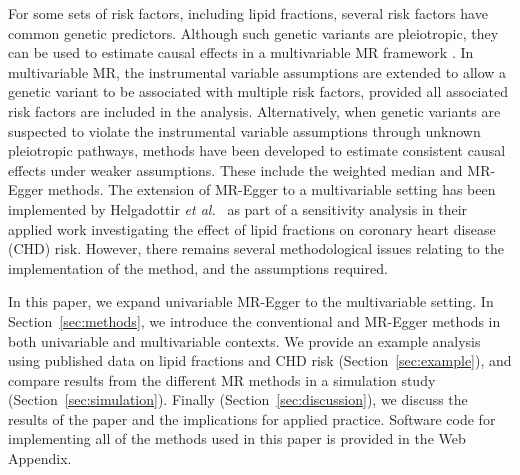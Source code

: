 \documentclass[a4paper,12pt]{article}
\begin{document}
\begin{bibunit}[wileyj]
For some sets of risk factors, including lipid fractions, several risk factors have common genetic predictors. Although such genetic variants are pleiotropic, they can be used to estimate causal effects in a multivariable MR framework \cite{burgess2015multivariable}. In multivariable MR, the instrumental variable assumptions are extended to allow a genetic variant to be associated with multiple risk factors, provided all associated risk factors are included in the analysis. Alternatively, when genetic variants are suspected to violate the instrumental variable assumptions through unknown pleiotropic pathways, methods have been developed to estimate consistent causal effects under weaker assumptions. These include the weighted median \cite{bowden2016consistent} and MR-Egger \cite{bowden2015egger} methods. The extension of MR-Egger to a multivariable setting has been implemented by Helgadottir \textit{et al.}\
\cite{helgadottir2016} as part of a sensitivity analysis in their applied work investigating the effect of lipid fractions on coronary heart disease (CHD) risk. However, there remains several methodological issues relating to the implementation of the method, and the assumptions required.

In this paper, we expand univariable MR-Egger to the multivariable setting. In Section~\ref{sec:methods}, we introduce the conventional and MR-Egger methods in both univariable and multivariable contexts. We provide an example analysis using published data on lipid fractions and CHD risk (Section~\ref{sec:example}), and compare results from the different MR methods in a simulation study (Section~\ref{sec:simulation}). Finally (Section~\ref{sec:discussion}), we discuss the results of the paper and the implications for applied practice. Software code for implementing all of the methods used in this paper is provided in the Web Appendix.


\end{bibunit}
\end{document}
